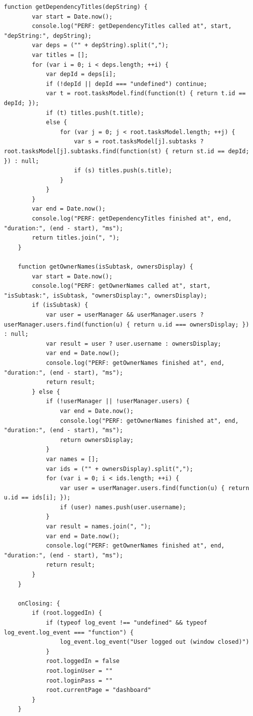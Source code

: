 \documentclass{report}
\begin{document}
\begin{lstlisting}[style=qmlstyle]
    function getDependencyTitles(depString) {
        var start = Date.now();
        console.log("PERF: getDependencyTitles called at", start, "depString:", depString);
        var deps = ("" + depString).split(",");
        var titles = [];
        for (var i = 0; i < deps.length; ++i) {
            var depId = deps[i];
            if (!depId || depId === "undefined") continue;
            var t = root.tasksModel.find(function(t) { return t.id == depId; });
            if (t) titles.push(t.title);
            else {
                for (var j = 0; j < root.tasksModel.length; ++j) {
                    var s = root.tasksModel[j].subtasks ? root.tasksModel[j].subtasks.find(function(st) { return st.id == depId; }) : null;
                    if (s) titles.push(s.title);
                }
            }
        }
        var end = Date.now();
        console.log("PERF: getDependencyTitles finished at", end, "duration:", (end - start), "ms");
        return titles.join(", ");
    }

    function getOwnerNames(isSubtask, ownersDisplay) {
        var start = Date.now();
        console.log("PERF: getOwnerNames called at", start, "isSubtask:", isSubtask, "ownersDisplay:", ownersDisplay);
        if (isSubtask) {
            var user = userManager && userManager.users ? userManager.users.find(function(u) { return u.id === ownersDisplay; }) : null;
            var result = user ? user.username : ownersDisplay;
            var end = Date.now();
            console.log("PERF: getOwnerNames finished at", end, "duration:", (end - start), "ms");
            return result;
        } else {
            if (!userManager || !userManager.users) {
                var end = Date.now();
                console.log("PERF: getOwnerNames finished at", end, "duration:", (end - start), "ms");
                return ownersDisplay;
            }
            var names = [];
            var ids = ("" + ownersDisplay).split(",");
            for (var i = 0; i < ids.length; ++i) {
                var user = userManager.users.find(function(u) { return u.id == ids[i]; });
                if (user) names.push(user.username);
            }
            var result = names.join(", ");
            var end = Date.now();
            console.log("PERF: getOwnerNames finished at", end, "duration:", (end - start), "ms");
            return result;
        }
    }

    onClosing: {
        if (root.loggedIn) {
            if (typeof log_event !== "undefined" && typeof log_event.log_event === "function") {
                log_event.log_event("User logged out (window closed)")
            }
            root.loggedIn = false
            root.loginUser = ""
            root.loginPass = ""
            root.currentPage = "dashboard"
        }
    }


\end{lstlisting}
\end{document}
